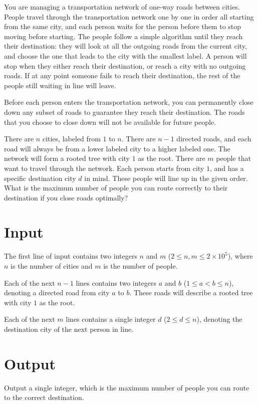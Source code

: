 
You are managing a transportation network of one-way roads between cities. People travel through the transportation network one by one in order all starting from the same city, and each person waits for the person before them to stop moving before starting. The people follow a simple algorithm until they reach their destination: they will look at all the outgoing roads from the current city, and choose the one that leads to the city with the smallest label. A person will stop when they either reach their destination, or reach a city with no outgoing roads. If at any point someone fails to reach their destination, the rest of the people still waiting in line will leave.

Before each person enters the transportation network, you can permanently close down any subset of roads to guarantee they reach their destination. The roads that you choose to close down will not be available for future people.

There are $n$ cities, labeled from $1$ to $n$. There are $n-1$ directed roads, and each road will always be from a lower labeled city to a higher labeled one. The network will form a rooted tree with city $1$ as the root. There are $m$ people that want to travel through the network. Each person starts from city $1$, and has a specific destination city $d$ in mind. These people will line up in the given order. What is the maximum number of people you can route correctly to their destination if you close roads optimally?

\section*{Input}
The first line of input contains two integers $n$ and $m$ ($2 \le n,m \le 2 \times 10^5$), where $n$ is the number of cities and $m$ is the number of people.

Each of the next $n-1$ lines contains two integers $a$ and $b$ ($1 \le a < b \le n$), denoting a directed road from city $a$ to $b$.
These roads will describe a rooted tree with city $1$ as the root.

Each of the next $m$ lines contains a single integer $d$ ($2 \le d \le n$), denoting the destination city of the next person in line.

\section*{Output}

Output a single integer, which is the maximum number of people you can route to the correct destination.

